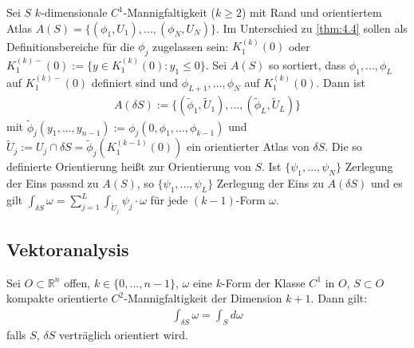\begin{theorem}[Definition] \label{thm:8.6}
  Sei $S$ $k$-dimensionale $C^1$-Mannigfaltigkeit ($k\ge 2$) mit Rand und orientiertem Atlas $A(S)=\{(\phi_1, U_1), ..., (\phi_N, U_N)\}$. 
  Im Unterschied zu \ref{thm:4.4} sollen als Definitionsbereiche für die $\phi_j$ zugelassen sein: $K_1^(k)(0)$ oder $ K_1^{(k)-}(0):=\{y\in K_1^{(k)}(0):y_1\le 0 \}$. 
  Sei $A(S)$ so sortiert, dass $\phi_1,..., \phi_L$ auf $K_1^{(k)-}(0)$ definiert sind und $\phi_{L+1},..., \phi_N$ auf $K_1^{(k)}(0)$.
  Dann ist 
  \begin{align*}
    A(\delta S):=\{(\tilde \phi_1, \tilde U_1),...,(\tilde \phi_L, \tilde U_L)\} 
  \end{align*}
  mit $\tilde \phi_j(y_1,..., y_{n-1}):=\phi_j(0, \phi_1,..., \phi_{k-1})$ und $\tilde U_j:= U_j \cap \delta S=\tilde \phi_j(K_1^{(k-1)}(0))$ ein orientierter Atlas von $\delta S$. Die so definierte Orientierung heißt   zur Orientierung von $S$.
  Ist $\{\psi_1,..., \psi_N\}$ Zerlegung der Eins passnd zu $A(S)$, so $\{\psi_1,..., \psi_L\}$ Zerlegung der Eins zu $A(\delta S)$ und es gilt $\int_{\delta S}\omega= \sum_{j=1}^L \int_{\tilde U_j} \psi_j \cdot \omega$ für jede $(k-1)$-Form $\omega$.
\end{theorem}

\subsection{Vektoranalysis}
\begin{theorem}
  Sei $O\subset \mathbb{R}^n$ offen, $k\in \{0,..., n-1\}$, $\omega$ eine $k$-Form der Klasse $C^1$ in $O$, $S\subset O$ kompakte orientierte $C^2$-Mannigfaltigkeit der Dimension $k+1$. Dann gilt:
  \begin{align*}
    \int_{\delta S} \omega=\int_S d\omega
  \end{align*}
  falls $S$, $\delta S$ verträglich orientiert wird.
\end{theorem}

